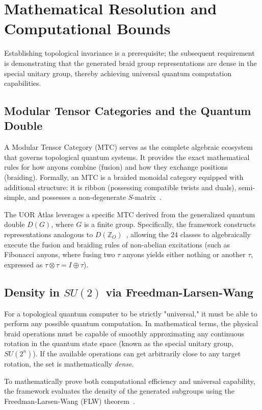 \section{Mathematical Resolution and Computational Bounds}

Establishing topological invariance is a prerequisite; the subsequent requirement is demonstrating that the generated braid group representations are dense in the special unitary group, thereby achieving universal quantum computation capabilities.

\subsection{Modular Tensor Categories and the Quantum Double}
A Modular Tensor Category (MTC) serves as the complete algebraic ecosystem that governs topological quantum systems. It provides the exact mathematical rules for how anyons combine (fusion) and how they exchange positions (braiding). Formally, an MTC is a braided monoidal category equipped with additional structure: it is ribbon (possessing compatible twists and duals), semi-simple, and possesses a non-degenerate $S$-matrix~\cite{bakalov2001}. 

The UOR Atlas leverages a specific MTC derived from the generalized quantum double $D(G)$, where $G$ is a finite group. Specifically, the framework constructs representations analogous to $D(\mathbb{Z}_O)$~\cite{drinfeld1987}, allowing the 24 classes to algebraically execute the fusion and braiding rules of non-abelian excitations (such as Fibonacci anyons, where fusing two $\tau$ anyons yields either nothing or another $\tau$, expressed as $\tau \otimes \tau = I \oplus \tau$).

\subsection{Density in \texorpdfstring{$SU(2)$}{SU (2)} via Freedman-Larsen-Wang}
For a topological quantum computer to be strictly "universal," it must be able to perform any possible quantum computation. In mathematical terms, the physical braid operations must be capable of smoothly approximating any continuous rotation in the quantum state space (known as the special unitary group, $SU(2^n)$). If the available operations can get arbitrarily close to any target rotation, the set is mathematically \textit{dense}.

To mathematically prove both computational efficiency and universal capability, the framework evaluates the density of the generated subgroups using the Freedman-Larsen-Wang (FLW) theorem~\cite{freedman2002}.

